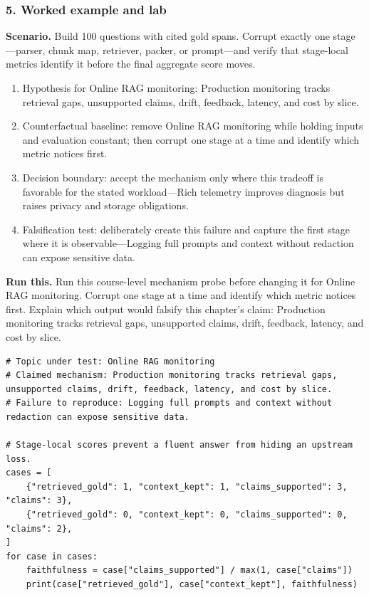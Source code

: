 \subsubsection*{5. Worked example and lab}
\textbf{Scenario.} Build 100 questions with cited gold spans. Corrupt exactly one stage—parser, chunk map, retriever, packer, or prompt—and verify that stage-local metrics identify it before the final aggregate score moves.
\begin{enumerate}
\item Hypothesis for Online RAG monitoring: Production monitoring tracks retrieval gaps, unsupported claims, drift, feedback, latency, and cost by slice.
\item Counterfactual baseline: remove Online RAG monitoring while holding inputs and evaluation constant; then corrupt one stage at a time and identify which metric notices first.
\item Decision boundary: accept the mechanism only where this tradeoff is favorable for the stated workload—Rich telemetry improves diagnosis but raises privacy and storage obligations.
\item Falsification test: deliberately create this failure and capture the first stage where it is observable—Logging full prompts and context without redaction can expose sensitive data.
\end{enumerate}
\textbf{Run this.} Run this course-level mechanism probe before changing it for Online RAG monitoring. Corrupt one stage at a time and identify which metric notices first. Explain which output would falsify this chapter's claim: Production monitoring tracks retrieval gaps, unsupported claims, drift, feedback, latency, and cost by slice.
\begin{Verbatim}[fontsize=\scriptsize]
# Topic under test: Online RAG monitoring
# Claimed mechanism: Production monitoring tracks retrieval gaps, unsupported claims, drift, feedback, latency, and cost by slice.
# Failure to reproduce: Logging full prompts and context without redaction can expose sensitive data.

# Stage-local scores prevent a fluent answer from hiding an upstream loss.
cases = [
    {"retrieved_gold": 1, "context_kept": 1, "claims_supported": 3, "claims": 3},
    {"retrieved_gold": 0, "context_kept": 0, "claims_supported": 0, "claims": 2},
]
for case in cases:
    faithfulness = case["claims_supported"] / max(1, case["claims"])
    print(case["retrieved_gold"], case["context_kept"], faithfulness)
\end{Verbatim}
